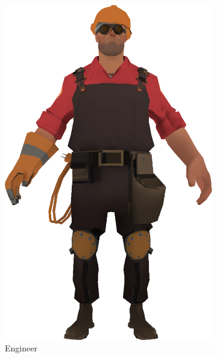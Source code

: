\newpage
{}

\begin{figure}[h]
    \centering
        \begin{subfigure}[b]{0.16\textwidth}
        \includegraphics[width=\textwidth]{img/textures/Original.png}
        \caption{Engineer}
        \label{fig:Original}
    \end{subfigure}
    ~
    \centering
    \begin{subfigure}[b]{0.16\textwidth}

\end{subfigure}
\end{figure}
